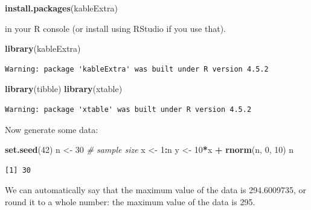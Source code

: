\documentclass[
]{article}
\newenvironment{Shaded}{\begin{snugshade}}{\end{snugshade}}
\newcommand{\CommentTok}[1]{\textcolor[rgb]{0.56,0.35,0.01}{\textit{#1}}}
\newcommand{\DecValTok}[1]{\textcolor[rgb]{0.00,0.00,0.81}{#1}}
\newcommand{\FunctionTok}[1]{\textcolor[rgb]{0.13,0.29,0.53}{\textbf{#1}}}
\newcommand{\NormalTok}[1]{#1}
\newcommand{\OtherTok}[1]{\textcolor[rgb]{0.56,0.35,0.01}{#1}}
\newcommand{\SpecialCharTok}[1]{\textcolor[rgb]{0.81,0.36,0.00}{\textbf{#1}}}
\begin{document}
\begin{Shaded}
\begin{Highlighting}[]
\FunctionTok{install.packages}\NormalTok{(kableExtra)}
\end{Highlighting}
\end{Shaded}

in your R console (or install using RStudio if you use that).

\begin{Shaded}
\begin{Highlighting}[]
\FunctionTok{library}\NormalTok{(kableExtra)}
\end{Highlighting}
\end{Shaded}

\begin{verbatim}
Warning: package 'kableExtra' was built under R version 4.5.2
\end{verbatim}

\begin{Shaded}
\begin{Highlighting}[]
\FunctionTok{library}\NormalTok{(tibble)}
\FunctionTok{library}\NormalTok{(xtable)}
\end{Highlighting}
\end{Shaded}

\begin{verbatim}
Warning: package 'xtable' was built under R version 4.5.2
\end{verbatim}

Now generate some data:

\begin{Shaded}
\begin{Highlighting}[]
\FunctionTok{set.seed}\NormalTok{(}\DecValTok{42}\NormalTok{)}
\NormalTok{n }\OtherTok{\textless{}{-}} \DecValTok{30}                      \CommentTok{\# sample size}
\NormalTok{x }\OtherTok{\textless{}{-}} \DecValTok{1}\SpecialCharTok{:}\NormalTok{n}
\NormalTok{y }\OtherTok{\textless{}{-}} \DecValTok{10}\SpecialCharTok{*}\NormalTok{x }\SpecialCharTok{+} \FunctionTok{rnorm}\NormalTok{(n, }\DecValTok{0}\NormalTok{, }\DecValTok{10}\NormalTok{)}
\NormalTok{n}
\end{Highlighting}
\end{Shaded}

\begin{verbatim}
[1] 30
\end{verbatim}

We can automatically say that the maximum value of the data is
294.6009735, or round it to a whole number: the maximum value of the
data is 295.
\end{document}
